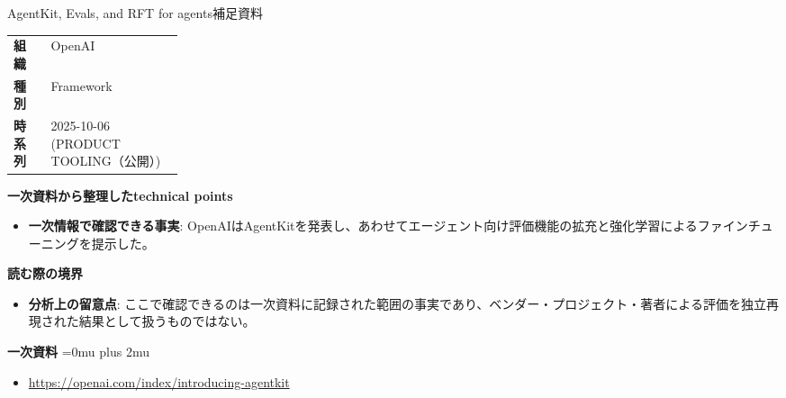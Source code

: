 \begin{technicalnote}{AgentKit, Evals, and RFT for agents}{補足資料}
\begingroup
\begin{tabularx}{\linewidth}{@{}>{\bfseries}p{0.22\linewidth}X@{}}
組織 & OpenAI \\
種別 & Framework \\
時系列 & 2025-10-06 (PRODUCT TOOLING（公開）) \\
\end{tabularx}
\smallskip
{\bfseries 一次資料から整理したtechnical points}
\begin{itemize}[leftmargin=1.5em,itemsep=0.35em]
\item \textbf{一次情報で確認できる事実}: OpenAIはAgentKitを発表し、あわせてエージェント向け評価機能の拡充と強化学習によるファインチューニングを提示した。
\end{itemize}
\begin{minipage}{\linewidth}
{\bfseries 読む際の境界}
\begin{itemize}[leftmargin=1.5em,itemsep=0.35em]
\item \textbf{分析上の留意点}: ここで確認できるのは一次資料に記録された範囲の事実であり、ベンダー・プロジェクト・著者による評価を独立再現された結果として扱うものではない。
\end{itemize}
\begin{samepage}
{\bfseries 一次資料}
\begingroup\sloppy
\Urlmuskip=0mu plus 2mu\relax
\begin{itemize}[leftmargin=1.5em,itemsep=0.25em]
\item {\scriptsize\url{https://openai.com/index/introducing-agentkit}}
\end{itemize}
\endgroup
\end{samepage}
\end{minipage}
\endgroup
\end{technicalnote}
\medskip

